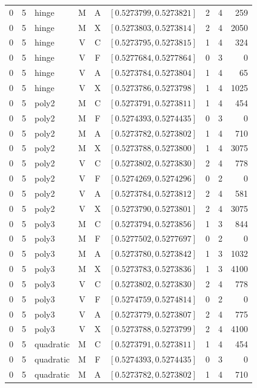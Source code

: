 \begin{longtable}{r r l c c l r r r}
0 & 5 & hinge & M & A & $[0.5273799,0.5273821]$ & 2 & 4 & 259 \\
0 & 5 & hinge & M & X & $[0.5273803,0.5273814]$ & 2 & 4 & 2050 \\
0 & 5 & hinge & V & C & $[0.5273795,0.5273815]$ & 1 & 4 & 324 \\
0 & 5 & hinge & V & F & $[0.5277684,0.5277864]$ & 0 & 3 & 0 \\
0 & 5 & hinge & V & A & $[0.5273784,0.5273804]$ & 1 & 4 & 65 \\
0 & 5 & hinge & V & X & $[0.5273786,0.5273798]$ & 1 & 4 & 1025 \\
0 & 5 & poly2 & M & C & $[0.5273791,0.5273811]$ & 1 & 4 & 454 \\
0 & 5 & poly2 & M & F & $[0.5274393,0.5274435]$ & 0 & 3 & 0 \\
0 & 5 & poly2 & M & A & $[0.5273782,0.5273802]$ & 1 & 4 & 710 \\
0 & 5 & poly2 & M & X & $[0.5273788,0.5273800]$ & 1 & 4 & 3075 \\
0 & 5 & poly2 & V & C & $[0.5273802,0.5273830]$ & 2 & 4 & 778 \\
0 & 5 & poly2 & V & F & $[0.5274269,0.5274296]$ & 0 & 2 & 0 \\
0 & 5 & poly2 & V & A & $[0.5273784,0.5273812]$ & 2 & 4 & 581 \\
0 & 5 & poly2 & V & X & $[0.5273790,0.5273801]$ & 2 & 4 & 3075 \\
0 & 5 & poly3 & M & C & $[0.5273794,0.5273856]$ & 1 & 3 & 844 \\
0 & 5 & poly3 & M & F & $[0.5277502,0.5277697]$ & 0 & 2 & 0 \\
0 & 5 & poly3 & M & A & $[0.5273780,0.5273842]$ & 1 & 3 & 1032 \\
0 & 5 & poly3 & M & X & $[0.5273783,0.5273836]$ & 1 & 3 & 4100 \\
0 & 5 & poly3 & V & C & $[0.5273802,0.5273830]$ & 2 & 4 & 778 \\
0 & 5 & poly3 & V & F & $[0.5274759,0.5274814]$ & 0 & 2 & 0 \\
0 & 5 & poly3 & V & A & $[0.5273779,0.5273807]$ & 2 & 4 & 775 \\
0 & 5 & poly3 & V & X & $[0.5273788,0.5273799]$ & 2 & 4 & 4100 \\
0 & 5 & quadratic & M & C & $[0.5273791,0.5273811]$ & 1 & 4 & 454 \\
0 & 5 & quadratic & M & F & $[0.5274393,0.5274435]$ & 0 & 3 & 0 \\
0 & 5 & quadratic & M & A & $[0.5273782,0.5273802]$ & 1 & 4 & 710 \\

\end{longtable}
